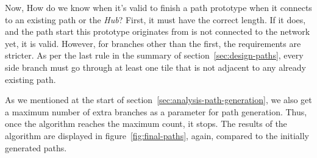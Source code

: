 Now, How do we know when it's valid to finish a path prototype when it connects to an existing path or the \emph{Hub}?
First, it must have the correct length.
If it does, and the path start this prototype originates from is not connected to the network yet, it is valid.
However, for branches other than the first, the requirements are stricter.
As per the last rule in the summary of section~\ref{sec:design-paths}, every side branch must go through at least one tile that is not adjacent to any already existing path.

As we mentioned at the start of section~\ref{sec:analysis-path-generation}, we also get a maximum number of extra branches as a parameter for path generation.
Thus, once the algorithm reaches the maximum count, it stops.
The results of the algorithm are displayed in figure~\ref{fig:final-paths}, again, compared to the initially generated paths.

